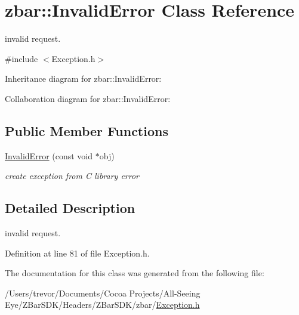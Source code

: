 \hypertarget{classzbar_1_1_invalid_error}{
\section{zbar::InvalidError Class Reference}
\label{classzbar_1_1_invalid_error}
}


invalid request.  




{\ttfamily \#include $<$Exception.h$>$}



Inheritance diagram for zbar::InvalidError:


Collaboration diagram for zbar::InvalidError:
\subsection*{Public Member Functions}
\begin{DoxyCompactItemize}
\item 
\hypertarget{classzbar_1_1_invalid_error_a2c160a21b5ac277a004b5d141fdaaef4}{
\hyperlink{classzbar_1_1_invalid_error_a2c160a21b5ac277a004b5d141fdaaef4}{InvalidError} (const void $\ast$obj)}
\label{classzbar_1_1_invalid_error_a2c160a21b5ac277a004b5d141fdaaef4}

\begin{DoxyCompactList}\small\item\em create exception from C library error \end{DoxyCompactList}\end{DoxyCompactItemize}


\subsection{Detailed Description}
invalid request. 

Definition at line 81 of file Exception.h.



The documentation for this class was generated from the following file:\begin{DoxyCompactItemize}
\item 
/Users/trevor/Documents/Cocoa Projects/All-\/Seeing Eye/ZBarSDK/Headers/ZBarSDK/zbar/\hyperlink{_exception_8h}{Exception.h}\end{DoxyCompactItemize}
